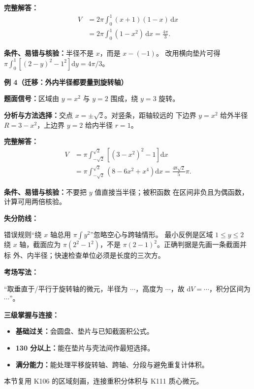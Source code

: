 \begin{knowledgeBox}
\textbf{完整解答：}
\[
\begin{aligned}
V&=2\pi\int_0^1(x+1)(1-x)\,\mathrm dx\\
&=2\pi\int_0^1(1-x^2)\,\mathrm dx=\frac{4\pi}{3}.
\end{aligned}
\]

\textbf{条件、易错与核验：}半径不是 \(x\)，而是 \(x-(-1)\)。
改用横向垫片可得
\(\pi\int_0^1[(2-y)^2-1^2]\mathrm dy=4\pi/3\)。

\textbf{例 4（迁移：外内半径都要量到旋转轴）}

\textbf{题面信号：}区域由 \(y=x^2\) 与 \(y=2\) 围成，绕
\(y=3\) 旋转。

\textbf{分析与方法选择：}交点 \(x=\pm\sqrt2\)。对竖条，距轴较远的
下边界 \(y=x^2\) 给外半径 \(R=3-x^2\)，上边界 \(y=2\) 给内半径
\(r=1\)。

\textbf{完整解答：}
\[
\begin{aligned}
V&=\pi\int_{-\sqrt2}^{\sqrt2}
\left[(3-x^2)^2-1\right]\mathrm dx\\
&=\pi\int_{-\sqrt2}^{\sqrt2}(8-6x^2+x^4)\mathrm dx
=\frac{48\sqrt2}{5}\pi.
\end{aligned}
\]

\textbf{条件、易错与核验：}不要把 \(y\) 值直接当半径；被积函数
在区间非负且为偶函数，计算可用两倍核验。

\textbf{失分防线：}

错误规则“绕 \(x\) 轴总用 \(\pi\int y^2\)”忽略空心与跨轴情形。
最小反例是区域 \(1\le y\le2\) 绕 \(x\) 轴，截面应为
\(\pi(2^2-1^2)\)，不是 \(\pi(2-1)^2\)。正确判据是先画一条截面并标
外、内半径；快速检查单位必须是长度的三次方。

\textbf{考场写法：}

“取垂直于/平行于旋转轴的微元，半径为 \(\cdots\)，高度为
\(\cdots\)，故 \(\mathrm dV=\cdots\)，积分区间为 \(\cdots\)”。

\textbf{三级掌握与连接：}
\begin{itemize}
  \item \textbf{基础过关：}会圆盘、垫片与已知截面积公式。
  \item \textbf{130 分以上：}能在垫片与壳法间作最短选择。
  \item \textbf{满分能力：}能处理平移旋转轴、跨轴、分段与避免重复计体积。
\end{itemize}
本节复用 K106 的区域刻画，连接重积分体积与 K111 质心微元。
\end{knowledgeBox}


\par


